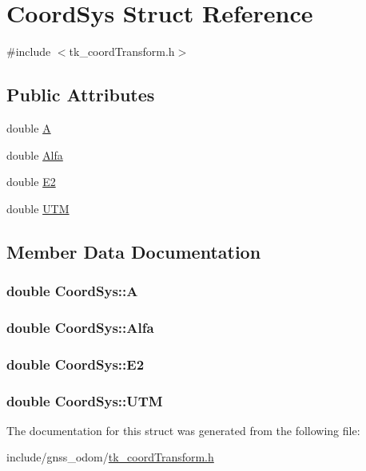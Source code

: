 \hypertarget{struct_coord_sys}{\section{Coord\-Sys Struct Reference}
\label{struct_coord_sys}
}


{\ttfamily \#include $<$tk\-\_\-coord\-Transform.\-h$>$}

\subsection*{Public Attributes}
\begin{DoxyCompactItemize}
\item 
double \hyperlink{struct_coord_sys_a9e45e1f06b98547b1a9c7c2c25f4a5ca}{A}
\item 
double \hyperlink{struct_coord_sys_aa52041aed38ce70353ebbf10a316ba82}{Alfa}
\item 
double \hyperlink{struct_coord_sys_a27cb0824467e651336ee5443a283e8df}{E2}
\item 
double \hyperlink{struct_coord_sys_a3f25874f46fddc2149b010c45a687f05}{U\-T\-M}
\end{DoxyCompactItemize}


\subsection{Member Data Documentation}
\hypertarget{struct_coord_sys_a9e45e1f06b98547b1a9c7c2c25f4a5ca}{
\subsubsection[{A}]{\setlength{\rightskip}{0pt plus 5cm}double Coord\-Sys\-::\-A}}\label{struct_coord_sys_a9e45e1f06b98547b1a9c7c2c25f4a5ca}
\hypertarget{struct_coord_sys_aa52041aed38ce70353ebbf10a316ba82}{
\subsubsection[{Alfa}]{\setlength{\rightskip}{0pt plus 5cm}double Coord\-Sys\-::\-Alfa}}\label{struct_coord_sys_aa52041aed38ce70353ebbf10a316ba82}
\hypertarget{struct_coord_sys_a27cb0824467e651336ee5443a283e8df}{
\subsubsection[{E2}]{\setlength{\rightskip}{0pt plus 5cm}double Coord\-Sys\-::\-E2}}\label{struct_coord_sys_a27cb0824467e651336ee5443a283e8df}
\hypertarget{struct_coord_sys_a3f25874f46fddc2149b010c45a687f05}{
\subsubsection[{U\-T\-M}]{\setlength{\rightskip}{0pt plus 5cm}double Coord\-Sys\-::\-U\-T\-M}}\label{struct_coord_sys_a3f25874f46fddc2149b010c45a687f05}


The documentation for this struct was generated from the following file\-:\begin{DoxyCompactItemize}
\item 
include/gnss\-\_\-odom/\hyperlink{tk__coord_transform_8h}{tk\-\_\-coord\-Transform.\-h}\end{DoxyCompactItemize}
